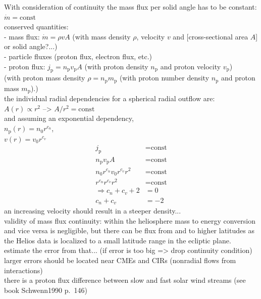 With consideration of continuity the mass flux per solid angle has to be constant: $\dot{m} = \text{const}$\\
conserved quantities:\\
- mass flux: $\dot{m} = \rho v A$ (with mass density $\rho$, velocity $v$ and [cross-sectional area $A$] or solid angle?...)\\
- particle fluxes (proton flux, electron flux, etc.)\\
	- proton flux: $j_\text{p} = n_\text{p} v_\text{p} A$ (with proton density $n_\text{p}$ and proton velocity $v_\text{p}$)\\

(with proton mass density $\rho = n_\text{p} m_\text{p}$ (with proton number density $n_\text{p}$ and proton mass $m_\text{p}$).)\\

the individual radial dependencies for a spherical radial outflow are:\\
$A(r) \propto r^2$ --> $A/r^2 = \text{const}$\\
and assuming an exponential dependency,\\
$n_{\text{p}}(r) = n_0 r^{c_n}$,\\
$v(r) = v_0 r^{c_v}$\\
\begin{align}
	j_\text{p} &= \text{const}\\
	n_\text{p} v_\text{p} A &= \text{const}\\
	n_0 r^{c_n} v_0 r^{c_v} r^2 &= \text{const}\\
	r^{c_n} r^{c_v} r^2 &= \text{const}\\
	\Rightarrow c_n + c_v + 2 &= 0\\
	c_n + c_v &= -2
\end{align}
an increasing velocity should result in a steeper density...\\

validity of mass flux continuity: within the heliosphere mass to energy conversion and vice versa is negligible, but there can be flux from and to higher latitudes as the Helios data is localized to a small latitude range in the ecliptic plane.\\
estimate the error from that... (if error is too big => drop continuity condition)\\
larger errors should be located near CMEs and CIRs (nonradial flows from interactions)\\
there is a proton flux difference between slow and fast solar wind streams (see book Schwenn1990 p.~146)

